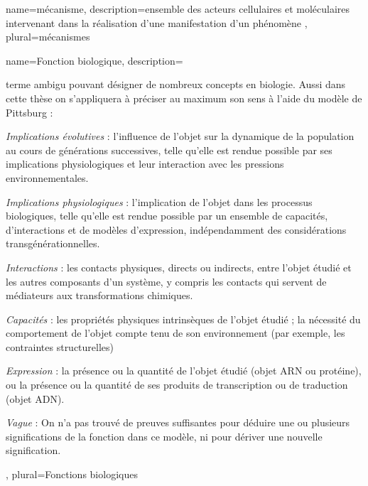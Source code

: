 
\printglossary[nonumberlist]
\glsaddall


{
	name={m\'{e}canisme},
	description={ensemble des acteurs cellulaires et moléculaires intervenant dans la réalisation d'une manifestation d'un phénomène \cite{Bechtel2013}}, 
	plural={m\'{e}canismes}
}

{
	name={Fonction biologique},
	description={terme ambigu pouvant désigner de nombreux concepts en biologie. Aussi dans cette thèse on s'appliquera à préciser au maximum son sens à l'aide du modèle de Pittsburg \cite{Keeling2019Nov}:
	\begin{description}
	    \item \textit{Implications évolutives} : l'influence de l'objet sur la dynamique de la population au cours de générations successives, telle qu'elle est rendue possible par ses implications physiologiques et leur interaction avec les pressions environnementales.
	    \item \textit{Implications physiologiques} : l'implication de l'objet dans les processus biologiques, telle qu'elle est rendue possible par un ensemble de capacités, d'interactions et de modèles d'expression, indépendamment des considérations transgénérationnelles.
	    \item \textit{Interactions} : les contacts physiques, directs ou indirects, entre l'objet étudié et les autres composants d'un système, y compris les contacts qui servent de médiateurs aux transformations chimiques.
	    \item \textit{Capacités} : les propriétés physiques intrinsèques de l'objet étudié ; la nécessité du comportement de l'objet compte tenu de son environnement (par exemple, les contraintes structurelles)
	    \item \textit{Expression} : la présence ou la quantité de l'objet étudié (objet ARN ou protéine), ou la présence ou la quantité de ses produits de transcription ou de traduction (objet ADN).
	    \item \textit{Vague} : On n'a pas trouvé de preuves suffisantes pour déduire une ou plusieurs significations de la fonction dans ce modèle, ni pour dériver une nouvelle signification.
	\end{description}
	}, 
	plural={Fonctions biologiques}
}


